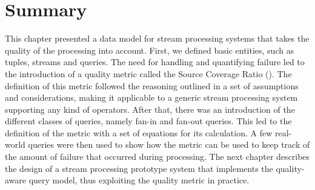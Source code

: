 \section{Summary}

This chapter presented a data model for stream processing systems that takes the quality of the
processing into account.
First, we defined basic entities, such as tuples, streams and queries. The need for handling and
quantifying failure led to the introduction of a quality metric called the Source Coverage Ratio
(\sic). The definition of this metric followed the reasoning outlined in a set of assumptions and
considerations, making it applicable to a generic stream processing system supporting any kind of
operators.
After that, there was an introduction of the different classes of queries, namely fan-in and fan-out
queries.
This led to the definition of the \sic metric with a set of equations for its calculation. A few
real-world queries were then used to show how the metric can be used to keep track
of the amount of failure that occurred during processing.
The next chapter describes the design of a stream processing prototype system that implements the
quality-aware query model, thus exploiting the \sic quality metric in practice.
